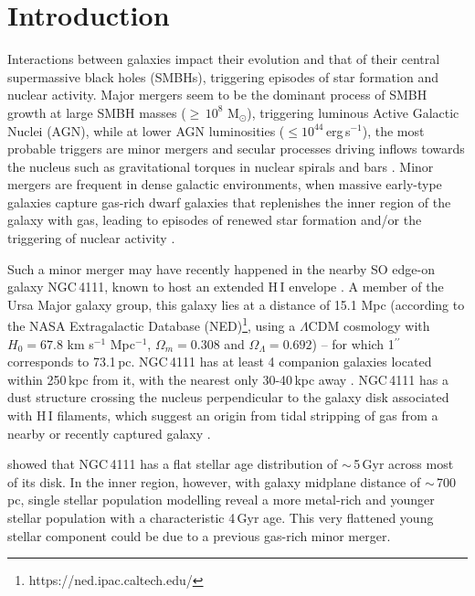 \documentclass[fleqn,usenatbib]{mnras}
\begin{document}

\section{Introduction}

Interactions between galaxies impact their evolution and that of their central supermassive black holes (SMBHs), triggering episodes of star formation and nuclear activity.
Major mergers seem to be the dominant process of SMBH growth at large SMBH masses ($\ge\,10^8$ M$_{\odot}$), triggering luminous Active Galactic Nuclei (AGN), while at lower AGN luminosities ($\le 10^{44}$\,erg\,s$^{-1}$), the most probable triggers are minor mergers and secular processes driving inflows towards the nucleus such as gravitational torques in nuclear spirals and bars \citep[][and references therein]{storchi-bergmann_observational_2019}.
Minor mergers are frequent in dense galactic environments, when massive early-type galaxies capture gas-rich dwarf galaxies that replenishes the inner region of the galaxy with gas, leading to episodes of renewed star formation and/or the triggering of nuclear activity \citep[e.g.][]{neistein_what_2014}. 

Such a minor merger may have recently happened in the nearby SO edge-on galaxy NGC\,4111, known to host an extended H\,I envelope \citep{wolfinger_blind_2013}. A member of the Ursa Major galaxy group, this galaxy lies at a distance of 15.1 Mpc (according to the NASA Extragalactic Database (NED)\footnote{https://ned.ipac.caltech.edu/}, using a $\Lambda\text{CDM}$ cosmology with $H_0 = 67.8$ km s$^{-1}$ Mpc$^{-1}$, $\Omega_m = 0.308$ and $\Omega_\Lambda = 0.692$) -- for which 1$^{\prime\prime}$ corresponds to 73.1\,pc. NGC\,4111 has at least 4 companion galaxies located within 250\,kpc from it, with the nearest only 30-40\,kpc away \citep{karachentsev_anatomy_2013, pak_properties_2014, kasparova_diversity_2016}. NGC\,4111 has a dust structure crossing the nucleus perpendicular to the galaxy disk \citep{barth_search_1998} associated with H\,I filaments, which suggest an origin from tidal stripping of gas from a nearby or recently captured galaxy \citep{verheijen_hi_2001, verheijen_galaxy_2004, pak_properties_2014}.

\citet{kasparova_diversity_2016} showed that NGC\,4111 has a flat stellar age distribution of $\sim$\,5\,Gyr across most of its disk. In the inner region, however, with galaxy midplane distance of $\sim$\,700\,pc, single stellar population modelling reveal a more metal-rich and younger stellar population with a characteristic 4\,Gyr age. This very flattened young stellar component could be due to a previous gas-rich minor merger.
\end{document}
